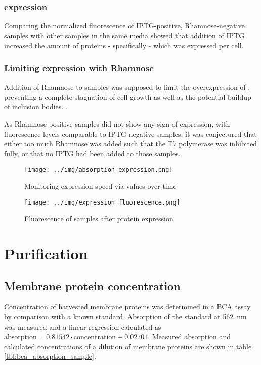 \subsubsection{\hsdsred{} expression}

Comparing the normalized fluorescence of IPTG-positive, Rhamnose-negative
samples with other samples in the same media showed that addition of IPTG
increased the amount of proteins - specifically \hsdsred{} - which was expressed
per cell.

\subsubsection{Limiting \hsdsred{} expression with Rhamnose}

Addition of Rhamnose to samples was supposed to limit the overexpression of
\hsdsred{}, preventing a complete stagnation of cell growth as well as the
potential buildup of inclusion bodies. \cite{memstar}.

As Rhamnose-positive samples did not show any sign of \hsdsred{} expression,
with fluorescence levels comparable to IPTG-negative samples, it was
conjectured that either too much Rhamnose was added such that the T7 polymerase
was inhibited fully, or that no IPTG had been added to those samples.


\begin{figure}
	\centering
	\texttt{[image: ../img/absorption\_expression.png]}
	\caption{Monitoring expression speed via \odbact values over time}
	\label{fig:absorption_expression}
\end{figure}

\begin{figure}
	\centering
	\texttt{[image: ../img/expression\_fluorescence.png]}
	\caption{Fluorescence of samples after protein expression}
	\label{fig:fluorescence_expression}
\end{figure}

\section{Purification}

\subsection{Membrane protein concentration}

Concentration of harvested membrane proteins was determined in a BCA assay by
comparison with a known standard. Absorption of the standard at \SI{562}{\nm}
was measured and a linear regression calculated as $\text{absorption} = 0.81542
\cdot \text{concentration} + 0.02701$. Measured absorption and calculated
concentrations of a dilution of membrane proteins are shown in table
\ref{tbl:bca_absorption_sample}.

